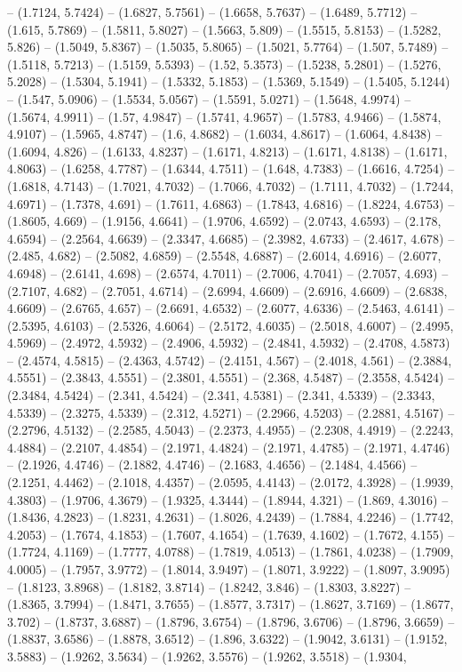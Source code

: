 -- (1.7124, 5.7424) -- (1.6827, 5.7561) -- (1.6658, 5.7637) -- (1.6489, 5.7712) -- (1.615, 5.7869) -- (1.5811, 5.8027) -- (1.5663, 5.809) -- (1.5515, 5.8153) -- (1.5282, 5.826) -- (1.5049, 5.8367) -- (1.5035, 5.8065) -- (1.5021, 5.7764) -- (1.507, 5.7489) -- (1.5118, 5.7213) -- (1.5159, 5.5393) -- (1.52, 5.3573) -- (1.5238, 5.2801) -- (1.5276, 5.2028) -- (1.5304, 5.1941) -- (1.5332, 5.1853) -- (1.5369, 5.1549) -- (1.5405, 5.1244) -- (1.547, 5.0906) -- (1.5534, 5.0567) -- (1.5591, 5.0271) -- (1.5648, 4.9974) -- (1.5674, 4.9911) -- (1.57, 4.9847) -- (1.5741, 4.9657) -- (1.5783, 4.9466) -- (1.5874, 4.9107) -- (1.5965, 4.8747) -- (1.6, 4.8682) -- (1.6034, 4.8617) -- (1.6064, 4.8438) -- (1.6094, 4.826) -- (1.6133, 4.8237) -- (1.6171, 4.8213) -- (1.6171, 4.8138) -- (1.6171, 4.8063) -- (1.6258, 4.7787) -- (1.6344, 4.7511) -- (1.648, 4.7383) -- (1.6616, 4.7254) -- (1.6818, 4.7143) -- (1.7021, 4.7032) -- (1.7066, 4.7032) -- (1.7111, 4.7032) -- (1.7244, 4.6971) -- (1.7378, 4.691) -- (1.7611, 4.6863) -- (1.7843, 4.6816) -- (1.8224, 4.6753) -- (1.8605, 4.669) -- (1.9156, 4.6641) -- (1.9706, 4.6592) -- (2.0743, 4.6593) -- (2.178, 4.6594) -- (2.2564, 4.6639) -- (2.3347, 4.6685) -- (2.3982, 4.6733) -- (2.4617, 4.678) -- (2.485, 4.682) -- (2.5082, 4.6859) -- (2.5548, 4.6887) -- (2.6014, 4.6916) -- (2.6077, 4.6948) -- (2.6141, 4.698) -- (2.6574, 4.7011) -- (2.7006, 4.7041) -- (2.7057, 4.693) -- (2.7107, 4.682) -- (2.7051, 4.6714) -- (2.6994, 4.6609) -- (2.6916, 4.6609) -- (2.6838, 4.6609) -- (2.6765, 4.657) -- (2.6691, 4.6532) -- (2.6077, 4.6336) -- (2.5463, 4.6141) -- (2.5395, 4.6103) -- (2.5326, 4.6064) -- (2.5172, 4.6035) -- (2.5018, 4.6007) -- (2.4995, 4.5969) -- (2.4972, 4.5932) -- (2.4906, 4.5932) -- (2.4841, 4.5932) -- (2.4708, 4.5873) -- (2.4574, 4.5815) -- (2.4363, 4.5742) -- (2.4151, 4.567) -- (2.4018, 4.561) -- (2.3884, 4.5551) -- (2.3843, 4.5551) -- (2.3801, 4.5551) -- (2.368, 4.5487) -- (2.3558, 4.5424) -- (2.3484, 4.5424) -- (2.341, 4.5424) -- (2.341, 4.5381) -- (2.341, 4.5339) -- (2.3343, 4.5339) -- (2.3275, 4.5339) -- (2.312, 4.5271) -- (2.2966, 4.5203) -- (2.2881, 4.5167) -- (2.2796, 4.5132) -- (2.2585, 4.5043) -- (2.2373, 4.4955) -- (2.2308, 4.4919) -- (2.2243, 4.4884) -- (2.2107, 4.4854) -- (2.1971, 4.4824) -- (2.1971, 4.4785) -- (2.1971, 4.4746) -- (2.1926, 4.4746) -- (2.1882, 4.4746) -- (2.1683, 4.4656) -- (2.1484, 4.4566) -- (2.1251, 4.4462) -- (2.1018, 4.4357) -- (2.0595, 4.4143) -- (2.0172, 4.3928) -- (1.9939, 4.3803) -- (1.9706, 4.3679) -- (1.9325, 4.3444) -- (1.8944, 4.321) -- (1.869, 4.3016) -- (1.8436, 4.2823) -- (1.8231, 4.2631) -- (1.8026, 4.2439) -- (1.7884, 4.2246) -- (1.7742, 4.2053) -- (1.7674, 4.1853) -- (1.7607, 4.1654) -- (1.7639, 4.1602) -- (1.7672, 4.155) -- (1.7724, 4.1169) -- (1.7777, 4.0788) -- (1.7819, 4.0513) -- (1.7861, 4.0238) -- (1.7909, 4.0005) -- (1.7957, 3.9772) -- (1.8014, 3.9497) -- (1.8071, 3.9222) -- (1.8097, 3.9095) -- (1.8123, 3.8968) -- (1.8182, 3.8714) -- (1.8242, 3.846) -- (1.8303, 3.8227) -- (1.8365, 3.7994) -- (1.8471, 3.7655) -- (1.8577, 3.7317) -- (1.8627, 3.7169) -- (1.8677, 3.702) -- (1.8737, 3.6887) -- (1.8796, 3.6754) -- (1.8796, 3.6706) -- (1.8796, 3.6659) -- (1.8837, 3.6586) -- (1.8878, 3.6512) -- (1.896, 3.6322) -- (1.9042, 3.6131) -- (1.9152, 3.5883) -- (1.9262, 3.5634) -- (1.9262, 3.5576) -- (1.9262, 3.5518) -- (1.9304, 